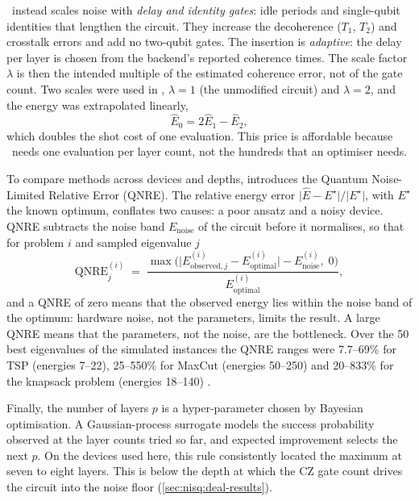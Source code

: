 \deal\ instead scales noise with \emph{delay and identity gates}: idle periods and single-qubit identities that lengthen the circuit. They increase the decoherence ($T_{1}$, $T_{2}$) and crosstalk errors and add no two-qubit gates. The insertion is \emph{adaptive}: the delay per layer is chosen from the backend's reported coherence times. The scale factor $\lambda$ is then the intended multiple of the estimated coherence error, not of the gate count. Two scales were used in \cite{guo2025deal}, $\lambda=1$ (the unmodified circuit) and $\lambda=2$, and the energy was extrapolated linearly,
\begin{equation}\label{eq:nisq:zne}
  \hat{E}_{0} = 2\hat{E}_{1} - \hat{E}_{2},
\end{equation}
which doubles the shot cost of one evaluation. This price is affordable because \deal\ needs one evaluation per layer count, not the hundreds that an optimiser needs.

To compare methods across devices and depths, \cite{guo2025deal} introduces the Quantum Noise-Limited Relative Error (QNRE). The relative energy error $\lvert\hat{E}-E^{\star}\rvert/\lvert E^{\star}\rvert$, with $E^{\star}$ the known optimum, conflates two causes: a poor ansatz and a noisy device. QNRE subtracts the noise band $E_{\mathrm{noise}}$ of the circuit before it normalises, so that for problem $i$ and sampled eigenvalue $j$
\begin{equation}\label{eq:nisq:qnre}
  \mathrm{QNRE}^{(i)}_{j} \;=\; \frac{\max\big(\lvert E^{(i)}_{\mathrm{observed},j}-E^{(i)}_{\mathrm{optimal}}\rvert - E^{(i)}_{\mathrm{noise}},\;0\big)}{E^{(i)}_{\mathrm{optimal}}},
\end{equation}
and a QNRE of zero means that the observed energy lies within the noise band of the optimum: hardware noise, not the parameters, limits the result. A large QNRE means that the parameters, not the noise, are the bottleneck. Over the 50 best eigenvalues of the simulated instances the QNRE ranges were 7.7--69\% for TSP (energies 7--22), 25--550\% for MaxCut (energies 50--250) and 20--833\% for the knapsack problem (energies 18--140) \cite{guo2025deal}.

Finally, the number of layers $p$ is a hyper-parameter chosen by Bayesian optimisation. A Gaussian-process surrogate models the success probability observed at the layer counts tried so far, and expected improvement selects the next $p$. On the devices used here, this rule consistently located the maximum at seven to eight layers. This is below the depth at which the CZ gate count drives the circuit into the noise floor (\cref{sec:nisq:deal-results}).

